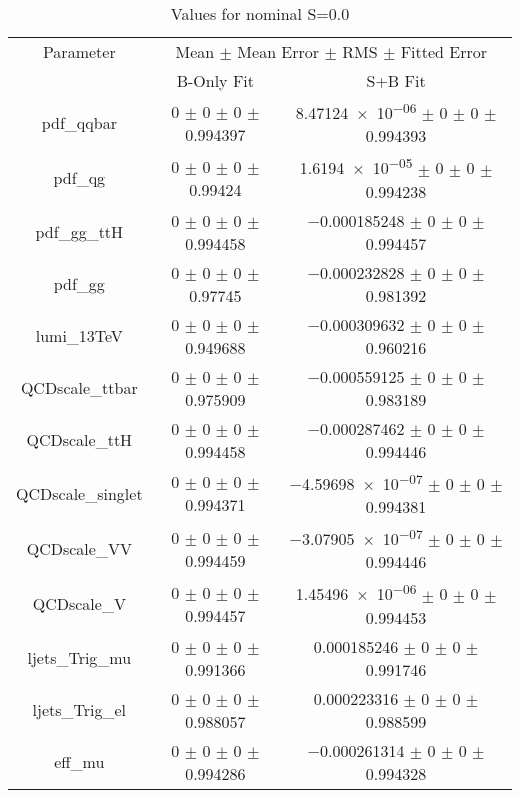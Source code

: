 \begin{table}
\centering
\caption{Values for nominal S=0.0}
\begin{tabular}{ccc}
\toprule
Parameter & \multicolumn{2}{c}{Mean $\pm$ Mean Error $\pm$ RMS $\pm$ Fitted Error}\\
 & B-Only Fit & S+B Fit\\
\midrule
pdf\_qqbar & \num{0} $\pm$ \num{0} $\pm$ \num{0} $\pm$ \num{0.994397} & \num{8.47124e-06} $\pm$ \num{0} $\pm$ \num{0} $\pm$ \num{0.994393}\\
pdf\_qg & \num{0} $\pm$ \num{0} $\pm$ \num{0} $\pm$ \num{0.99424} & \num{1.6194e-05} $\pm$ \num{0} $\pm$ \num{0} $\pm$ \num{0.994238}\\
pdf\_gg\_ttH & \num{0} $\pm$ \num{0} $\pm$ \num{0} $\pm$ \num{0.994458} & \num{-0.000185248} $\pm$ \num{0} $\pm$ \num{0} $\pm$ \num{0.994457}\\
pdf\_gg & \num{0} $\pm$ \num{0} $\pm$ \num{0} $\pm$ \num{0.97745} & \num{-0.000232828} $\pm$ \num{0} $\pm$ \num{0} $\pm$ \num{0.981392}\\
lumi\_13TeV & \num{0} $\pm$ \num{0} $\pm$ \num{0} $\pm$ \num{0.949688} & \num{-0.000309632} $\pm$ \num{0} $\pm$ \num{0} $\pm$ \num{0.960216}\\
QCDscale\_ttbar & \num{0} $\pm$ \num{0} $\pm$ \num{0} $\pm$ \num{0.975909} & \num{-0.000559125} $\pm$ \num{0} $\pm$ \num{0} $\pm$ \num{0.983189}\\
QCDscale\_ttH & \num{0} $\pm$ \num{0} $\pm$ \num{0} $\pm$ \num{0.994458} & \num{-0.000287462} $\pm$ \num{0} $\pm$ \num{0} $\pm$ \num{0.994446}\\
QCDscale\_singlet & \num{0} $\pm$ \num{0} $\pm$ \num{0} $\pm$ \num{0.994371} & \num{-4.59698e-07} $\pm$ \num{0} $\pm$ \num{0} $\pm$ \num{0.994381}\\
QCDscale\_VV & \num{0} $\pm$ \num{0} $\pm$ \num{0} $\pm$ \num{0.994459} & \num{-3.07905e-07} $\pm$ \num{0} $\pm$ \num{0} $\pm$ \num{0.994446}\\
QCDscale\_V & \num{0} $\pm$ \num{0} $\pm$ \num{0} $\pm$ \num{0.994457} & \num{1.45496e-06} $\pm$ \num{0} $\pm$ \num{0} $\pm$ \num{0.994453}\\
ljets\_Trig\_mu & \num{0} $\pm$ \num{0} $\pm$ \num{0} $\pm$ \num{0.991366} & \num{0.000185246} $\pm$ \num{0} $\pm$ \num{0} $\pm$ \num{0.991746}\\
ljets\_Trig\_el & \num{0} $\pm$ \num{0} $\pm$ \num{0} $\pm$ \num{0.988057} & \num{0.000223316} $\pm$ \num{0} $\pm$ \num{0} $\pm$ \num{0.988599}\\
eff\_mu & \num{0} $\pm$ \num{0} $\pm$ \num{0} $\pm$ \num{0.994286} & \num{-0.000261314} $\pm$ \num{0} $\pm$ \num{0} $\pm$ \num{0.994328}\\

\end{tabular}
\end{table}
